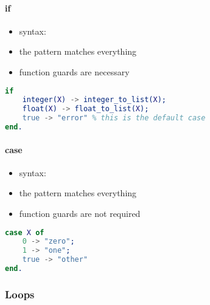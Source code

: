 \documentclass[a4paper,landscape,10pt]{article}
\begin{document}
\begin{multicols*}{2}
  \paragraph{if}

  \begin{itemize}
    \item syntax: 
    \item the  pattern matches everything
    \item function guards are necessary
  \end{itemize}

  \begin{lstlisting}[language=Erlang]
if
    integer(X) -> integer_to_list(X);
    float(X) -> float_to_list(X);
    true -> "error" % this is the default case
end.
  \end{lstlisting}

  \paragraph{case}

  \begin{itemize}
    \item syntax: 
    \item the  pattern matches everything
    \item function guards are not required
  \end{itemize}

  \begin{lstlisting}[language=Erlang]
case X of
    0 -> "zero";
    1 -> "one";
    true -> "other"
end.
  \end{lstlisting}

  \subsubsection{Loops}

  \missing

\end{multicols*}

\clearpage
\end{document}
